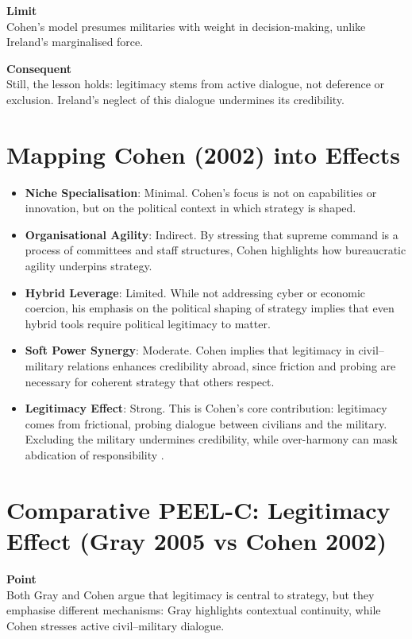 \textbf{Limit} \\
Cohen’s model presumes militaries with weight in decision-making, unlike Ireland’s marginalised force.  

\textbf{Consequent} \\
Still, the lesson holds: legitimacy stems from active dialogue, not deference or exclusion. Ireland’s neglect of this dialogue undermines its credibility.  

\section*{Mapping Cohen (2002) into Effects}

\begin{itemize}
	\item \textbf{Niche Specialisation}: Minimal. Cohen’s focus is not on capabilities or innovation, but on the political context in which strategy is shaped.
	\item \textbf{Organisational Agility}: Indirect. By stressing that supreme command is a process of committees and staff structures, Cohen highlights how bureaucratic agility underpins strategy.
	\item \textbf{Hybrid Leverage}: Limited. While not addressing cyber or economic coercion, his emphasis on the political shaping of strategy implies that even hybrid tools require political legitimacy to matter.
	\item \textbf{Soft Power Synergy}: Moderate. Cohen implies that legitimacy in civil--military relations enhances credibility abroad, since friction and probing are necessary for coherent strategy that others respect.
	\item \textbf{Legitimacy Effect}: Strong. This is Cohen’s core contribution: legitimacy comes from frictional, probing dialogue between civilians and the military. Excluding the military undermines credibility, while over-harmony can mask abdication of responsibility \parencite{COHEN_2002}.
\end{itemize}

\section*{Comparative PEEL-C: Legitimacy Effect (Gray 2005 vs Cohen 2002)}

\textbf{Point} \\
Both Gray and Cohen argue that legitimacy is central to strategy, but they emphasise different mechanisms: Gray highlights contextual continuity, while Cohen stresses active civil--military dialogue.  


